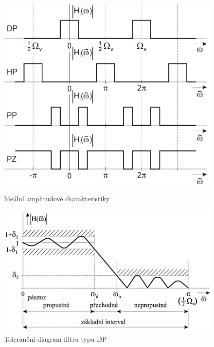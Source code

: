 \begin{figure}[h]
	\centering
	\begin{minipage}[b]{0.4\textwidth}
		\includegraphics[width=1\linewidth]{../assets/figures/amp_characteristics}
		\caption{Ideální amplitudové charakteristiky~\cite{Skop1994}}
		\label{fig:amp_characteristics}
	\end{minipage}
	\hfill
	\begin{minipage}[b]{0.5\textwidth}
		\includegraphics[width=1\linewidth]{../assets/figures/tolerance_diagram}
		\caption{Toleranční diagram filtru typu DP~\cite{Skop1994}}
		\label{fig:tolerance_diagram}
	\end{minipage}
\end{figure}

